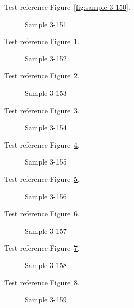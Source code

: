 Test reference Figure~\ref{fig:sample-3-150}.

\begin{figure}[tbhp]
\caption{Sample 3-151}
\label{fig:sample-3-151}
\end{figure}

Test reference Figure~\ref{fig:sample-3-151}.

\begin{figure}[tbhp]
\caption{Sample 3-152}
\label{fig:sample-3-152}
\end{figure}

Test reference Figure~\ref{fig:sample-3-152}.

\begin{figure}[tbhp]
\caption{Sample 3-153}
\label{fig:sample-3-153}
\end{figure}

Test reference Figure~\ref{fig:sample-3-153}.

\begin{figure}[tbhp]
\caption{Sample 3-154}
\label{fig:sample-3-154}
\end{figure}

Test reference Figure~\ref{fig:sample-3-154}.

\begin{figure}[tbhp]
\caption{Sample 3-155}
\label{fig:sample-3-155}
\end{figure}

Test reference Figure~\ref{fig:sample-3-155}.

\begin{figure}[tbhp]
\caption{Sample 3-156}
\label{fig:sample-3-156}
\end{figure}

Test reference Figure~\ref{fig:sample-3-156}.

\begin{figure}[tbhp]
\caption{Sample 3-157}
\label{fig:sample-3-157}
\end{figure}

Test reference Figure~\ref{fig:sample-3-157}.

\begin{figure}[tbhp]
\caption{Sample 3-158}
\label{fig:sample-3-158}
\end{figure}

Test reference Figure~\ref{fig:sample-3-158}.

\begin{figure}[tbhp]
\caption{Sample 3-159}
\label{fig:sample-3-159}
\end{figure}

